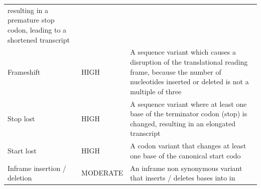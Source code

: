 \documentclass[12pt,twoside]{reedthesis}
\theoremstyle{definition}
\theoremstyle{definition}
\theoremstyle{remark}
\begin{document}
\begin{longtable}[]{@{}lll@{}}
\begin{minipage}[t]{0.63\columnwidth}
  resulting in a premature stop codon, leading to a shortened
  transcript\strut
  \end{minipage}\tabularnewline
  \begin{minipage}[t]{0.18\columnwidth}\raggedright\strut
  Frameshift\strut
  \end{minipage} & \begin{minipage}[t]{0.11\columnwidth}\raggedright\strut
  HIGH\strut
  \end{minipage} & \begin{minipage}[t]{0.63\columnwidth}\raggedright\strut
  A sequence variant which causes a disruption of the translational
  reading frame, because the number of nucleotides inserted or deleted is
  not a multiple of three\strut
  \end{minipage}\tabularnewline
  \begin{minipage}[t]{0.18\columnwidth}\raggedright\strut
  Stop lost\strut
  \end{minipage} & \begin{minipage}[t]{0.11\columnwidth}\raggedright\strut
  HIGH\strut
  \end{minipage} & \begin{minipage}[t]{0.63\columnwidth}\raggedright\strut
  A sequence variant where at least one base of the terminator codon
  (stop) is changed, resulting in an elongated transcript\strut
  \end{minipage}\tabularnewline
  \begin{minipage}[t]{0.18\columnwidth}\raggedright\strut
  Start lost\strut
  \end{minipage} & \begin{minipage}[t]{0.11\columnwidth}\raggedright\strut
  HIGH\strut
  \end{minipage} & \begin{minipage}[t]{0.63\columnwidth}\raggedright\strut
  A codon variant that changes at least one base of the canonical start
  codo\strut
  \end{minipage}\tabularnewline
  \begin{minipage}[t]{0.18\columnwidth}\raggedright\strut
  Inframe insertion / deletion\strut
  \end{minipage} & \begin{minipage}[t]{0.11\columnwidth}\raggedright\strut
  MODERATE\strut
  \end{minipage} & \begin{minipage}[t]{0.63\columnwidth}\raggedright\strut
  An inframe non synonymous variant that inserts / deletes bases into in

\end{minipage}
\end{longtable}
\end{document}
